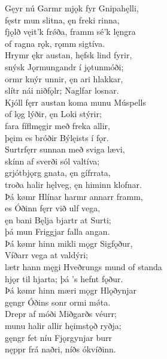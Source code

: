 \bva Gęyr nú Garmr mjǫk \hld fyr Gnipahęlli, \\%
fęstr mun slitna, \hld ęn freki rinna, \\%
fjǫlð vęit'k frǿða, \hld framm sé'k lęngra \\%
of ragna rǫk, \hld rǫmm sigtíva.\\%

\bva Hrymr ękr austan, \hld hęfsk lind fyrir, \\%
snýsk Jǫrmungandr \hld í jǫtunmóði; \\%
ormr knýr unnir, \hld ęn ari hlakkar, \\%
slítr nái niðfǫlr; \hld Naglfar losnar.\\%

\bva Kjóll fęrr austan \hld koma munu Múspells \\%
of lǫg lýðir, \hld ęn Loki stýrir; \\%
fara fíflmęgir \hld með freka allir, \\%
þęim es bróðir \hld Býlęists í fǫr.\\%

\bva Surtr\footnotemark[19] fęrr sunnan \hld með sviga lævi, \\%
skínn af sverði \hld sól valtíva; \\%
grjótbjǫrg gnata, \hld ęn gífr\footnotemark[20] rata, \\%
troða halir hęlveg, \hld ęn himinn klofnar.
\\%

\bva Þá kømr Hlínar \hld harmr annarr framm, \\%
es Óðinn fęrr \hld við ulf vega, \\%
ęn bani Bęlja \hld bjartr at Surti; \\%
þá mun Friggjar \hld falla angan.\\%

\bva Þá kømr hinn mikli \hld mǫgr Sigfǫður, \\%
Víðarr vega \hld at valdýri; \\%
lætr hann męgi Hveðrungs \hld mund of standa \\%
hjǫr til hjarta; \hld þá ’s hefnt fǫður.\\%

\bva Þá kømr hinn mæri \hld mǫgr Hlǫðynjar \\%
gęngr Óðins sonr \hld ormi mǿta. \\%
Drepr af móði \hld Miðgarðs véurr; \\%
munu halir allir \hld hęimstǫð ryðja; \\%
gęngr fet níu \hld Fjǫrgynjar burr \\%
nęppr frá naðri, \hld níðs ókvíðinn.\\%

